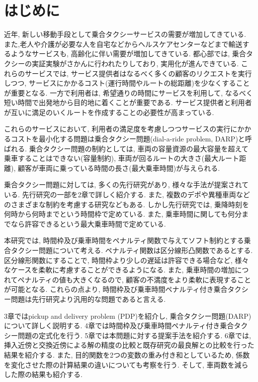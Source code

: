 \chapter{はじめに}
近年, 新しい移動手段として乗合タクシーサービスの需要が増加してきている. また,老人や介護が必要な人を自宅などからヘルスケアセンターなどまで輸送するようなサービスも, 高齢化に伴い需要が増加してきている.
都心部では, 乗合タクシーの実証実験がさかんに行われたりしており, 実用化が進んできている. これらのサービスでは, サービス提供者はなるべく多くの顧客のリクエストを実行しつつ, サービスにかかるコスト(運行時間やルートの総距離)を少なくすることが重要となる. 一方で利用者は, 希望通りの時間にサービスを利用して, なるべく短い時間で出発地から目的地に着くことが重要である. サービス提供者と利用者が互いに満足のいくルートを作成することの必要性が高まっている.

これらのサービスにおいて, 利用者の満足度を考慮しつつサービスの実行にかかるコストを最小化する問題は乗合タクシー問題(dial-a-ride problem, DARP)と呼ばれる.
乗合タクシー問題の制約としては, 車両の容量資源の最大容量を超えて乗車することはできない(容量制約), 車両が回るルートの大きさ(最大ルート距離), 顧客が車両に乗っている時間の長さ(最大乗車時間)が与えられる.

乗合タクシー問題に対しては, 多くの先行研究があり, 様々な手法が提案されている. 先行研究の一部を2章で詳しく紹介する. また, 複数のデポや異種車両などのさまざまな制約を考慮する研究などもある. しかし先行研究では, 乗降時刻を何時から何時までという時間枠で定めている. また, 乗車時間に関しても何分までなら許容できるという最大乗車時間で定めている.

本研究では, 時間枠及び乗車時間をペナルティ関数で与えてソフト制約とする乗合タクシー問題について考える. ペナルティ関数は区分線形凸関数であるとする. 区分線形関数にすることで, 時間枠より少しの遅延は許容できる場合など, 様々なケースを柔軟に考慮することができるようになる. また, 乗車時間の増加につれてペナルティの値も大きくなるので, 顧客の不満度をより柔軟に表現することが可能となる. これらの点より, 時間枠及び乗車時間ペナルティ付き乗合タクシー問題は先行研究より汎用的な問題であると言える.

3章ではpickup and delivery problem (PDP)を紹介し, 乗合タクシー問題(DARP)について詳しく説明する. 4章では時間枠及び乗車時間ペナルティ付き乗合タクシー問題の定式化を行う. 5章では本問題に対する提案手法を紹介する.
6章では, 挿入近傍と交換近傍による解の精度の比較と既存研究の最良解との比較を行った結果を紹介する. また, 目的関数を2つの変数の重み付き和としているため, 係数を変化させた際の計算結果の違いについても考察を行う. そして, 車両数を減らした際の結果も紹介する.
